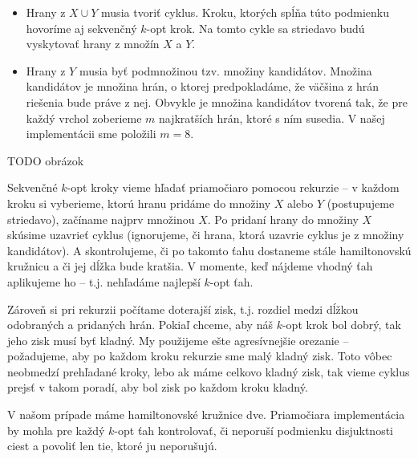 \begin{itemize}
\item Hrany z $X \cup Y$ musia tvoriť cyklus. Kroku, ktorých spĺňa túto podmienku
hovoríme aj sekvenčný $k$-opt krok. Na tomto cykle sa striedavo budú vyskytovať hrany z množín
$X$ a $Y$.
\item Hrany z $Y$ musia byť podmnožinou tzv. množiny kandidátov. Množina kandidátov je množina hrán,
o ktorej predpokladáme, že väčšina z hrán riešenia bude práve z nej. Obvykle je množina kandidátov
tvorená tak, že pre každý vrchol zoberieme $m$ najkratších hrán, ktoré s ním susedia. V našej
implementácii sme položili $m = 8$.
\end{itemize}

TODO obrázok

Sekvenčné $k$-opt kroky vieme hľadať priamočiaro pomocou rekurzie -- v každom kroku si vyberieme,
ktorú hranu pridáme do množiny $X$ alebo $Y$ (postupujeme striedavo), začíname najprv množinou $X$.
Po pridaní hrany do množiny $X$ skúsime uzavrieť cyklus (ignorujeme, či hrana, ktorá uzavrie
cyklus je z množiny kandidátov). A skontrolujeme, či po takomto ťahu dostaneme stále hamiltonovskú
kružnicu a či jej dĺžka bude kratšia. V momente, keď nájdeme vhodný ťah aplikujeme ho -- t.j.
nehľadáme najlepší $k$-opt ťah.

Zároveň si pri rekurzii počítame doterajší zisk, t.j. rozdiel medzi dĺžkou odobraných a pridaných hrán.
Pokiaľ chceme, aby náš $k$-opt krok bol dobrý, tak jeho zisk musí byť kladný. My použijeme ešte
agresívnejšie orezanie -- požadujeme, aby po každom kroku rekurzie sme malý kladný zisk. Toto vôbec
neobmedzí prehľadané kroky, lebo ak máme celkovo kladný zisk, tak vieme cyklus prejsť v takom
poradí, aby bol zisk po každom kroku kladný.

\medskip

V našom prípade máme hamiltonovské kružnice dve. Priamočiara implementácia by mohla pre každý
$k$-opt ťah kontrolovať, či neporuší podmienku disjuktnosti ciest a povoliť len tie, ktoré ju
neporušujú.

